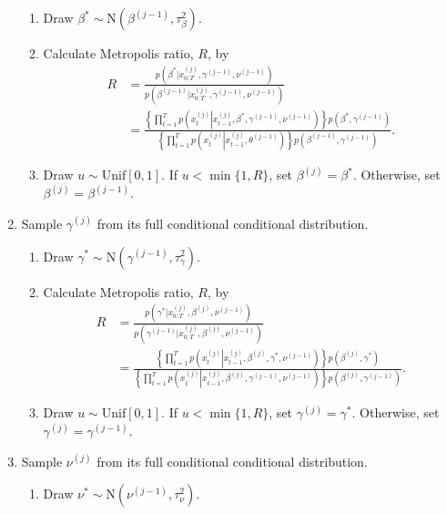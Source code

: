 \begin{enumerate}
    \begin{enumerate}
    \item Draw $\beta^* \sim \mbox{N}\left(\beta^{(j-1)},\tau^2_{\beta}\right)$.
    \item Calculate Metropolis ratio, $R$, by
    \begin{align*}
    R &= \frac{p\left(\beta^*|x_{0:T}^{(j)},\gamma^{(j-1)},\nu^{(j-1)}\right)}{p\left(\beta^{(j-1)}|x_{0:T}^{(j)},\gamma^{(j-1)},\nu^{(j-1)}\right)} \\
     &= \frac{\left\{\prod_{t=1}^T p\left(x^{(j)}_t\left|x^{(j)}_{t-1},\beta^*,\gamma^{(j-1)},\nu^{(j-1)}\right.\right)\right\}p(\beta^*,\gamma^{(j-1)})}{\left\{\prod_{t=1}^T p\left(x^{(j)}_t\left|x^{(j)}_{t-1},\theta^{(j-1)}\right.\right)\right\}p\left(\beta^{(j-1)},\gamma^{(j-1)}\right)}.
    \end{align*}
    \item Draw $u \sim \mbox{Unif}[0,1]$. If $u < \min\{1, R\}$, set $\beta^{(j)} = \beta^*$. Otherwise, set $\beta^{(j)} = \beta^{(j-1)}$.
    \end{enumerate}
\item \label{step:gamma} Sample $\gamma^{(j)}$ from its full conditional conditional distribution.
    \begin{enumerate}
    \item Draw $\gamma^* \sim \mbox{N}\left(\gamma^{(j-1)},\tau^2_{\gamma}\right)$.
    \item Calculate Metropolis ratio, $R$, by
    \begin{align*}
    R &=     \frac{p\left(\gamma^*|x_{0:T}^{(j)},\beta^{(j)},\nu^{(j-1)}\right)}{p\left(\gamma^{(j-1)}|x_{0:T}^{(j)},\beta^{(j)},\nu^{(j-1)}\right)} \\
     &= \frac{\left\{\prod_{t=1}^T p\left(x^{(j)}_t\left|x^{(j)}_{t-1},\beta^{(j)},\gamma^*,\nu^{(j-1)}\right.\right)\right\}p(\beta^{(j)}, \gamma^*)}{\left\{\prod_{t=1}^T p\left(x^{(j)}_t\left|x^{(j)}_{t-1},\beta^{(j)},\gamma^{(j-1)},\nu^{(j-1)}\right.\right)\right\}p\left(\beta^{(j)}, \gamma^{(j-1)}\right)}.
    \end{align*}
    \item Draw $u \sim \mbox{Unif}[0,1]$. If $u < \min\{1, R\}$, set $\gamma^{(j)} = \gamma^*$. Otherwise, set $\gamma^{(j)} = \gamma^{(j-1)}$.
    \end{enumerate}
\item \label{step:nu} Sample $\nu^{(j)}$ from its full conditional conditional distribution.
    \begin{enumerate}
    \item Draw $\nu^* \sim \mbox{N}\left(\nu^{(j-1)},\tau^2_{\nu}\right)$.

\end{enumerate}
\end{enumerate}
